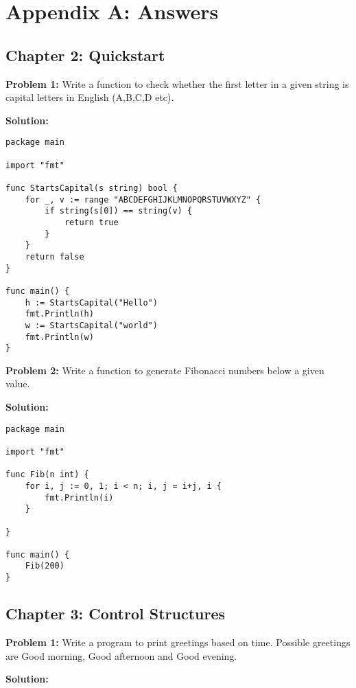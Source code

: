 \cleardoublepage
{}
\chapter*{Appendix A: Answers}

\section*{Chapter 2: Quickstart}

\textbf{Problem 1:} Write a function to check whether the first letter
in a given string is capital letters in English (A,B,C,D etc).

\textbf{Solution:}

\begin{lstlisting}[numbers=none]
package main

import "fmt"

func StartsCapital(s string) bool {
    for _, v := range "ABCDEFGHIJKLMNOPQRSTUVWXYZ" {
        if string(s[0]) == string(v) {
            return true
        }
    }
    return false
}

func main() {
    h := StartsCapital("Hello")
    fmt.Println(h)
    w := StartsCapital("world")
    fmt.Println(w)
}
\end{lstlisting}

\textbf{Problem 2:} Write a function to generate Fibonacci numbers
below a given value.

\textbf{Solution:}

\begin{lstlisting}[numbers=none]
package main

import "fmt"

func Fib(n int) {
    for i, j := 0, 1; i < n; i, j = i+j, i {
        fmt.Println(i)
    }

}

func main() {
    Fib(200)
}
\end{lstlisting}

\section*{Chapter 3: Control Structures}

\textbf{Problem 1:} Write a program to print greetings based on time.
Possible greetings are Good morning, Good afternoon and Good evening.

\textbf{Solution:}

